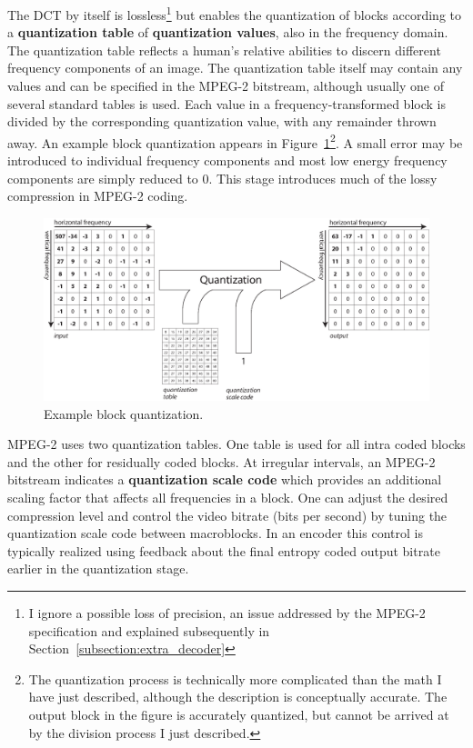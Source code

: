 The DCT by itself is lossless\footnote{I ignore a possible loss of 
precision, an issue addressed by the MPEG-2 specification and explained
subsequently in Section~\ref{subsection:extra_decoder}}
but enables the quantization of blocks according to a 
\textbf{quantization table} of \textbf{quantization values}, 
also in the frequency domain. The quantization table reflects
a human's relative abilities to discern different frequency
components of an image. 
The quantization table itself may contain any values and can be
specified in the MPEG-2 bitstream, although usually one 
of several standard tables is used.
Each value in a frequency-transformed
block is divided by the corresponding quantization value, with
any remainder thrown away. An example block quantization appears
in Figure~\ref{fig:quantize}\footnote{The quantization process is
technically more complicated than the math I have just described,
although the description is conceptually accurate. The output block
in the figure is accurately quantized, but cannot be arrived at by
the division process I just described.}.
A small error may be introduced
to individual frequency components and most low energy frequency components
are simply reduced to $0$. This stage introduces much of the lossy 
compression in MPEG-2 coding. 

\begin{figure}[h]
  \begin{center}
    \includegraphics[scale=0.6, angle=0]{./quantization_example2.eps}
    \caption{Example block quantization.}
    \label{fig:quantize}
  \end{center}
\end{figure}

MPEG-2 uses two quantization tables. One table is used for all 
intra coded blocks and the other for residually coded blocks. 
At irregular intervals, an MPEG-2 bitstream indicates a 
\textbf{quantization scale code} which provides an additional 
scaling factor that affects all frequencies in a block. 
One can adjust the desired compression level and
control the video bitrate (bits per second)
by tuning the quantization scale code between macroblocks. 
In an encoder this control 
is typically realized using feedback about the final entropy coded 
output bitrate earlier in the quantization stage.

